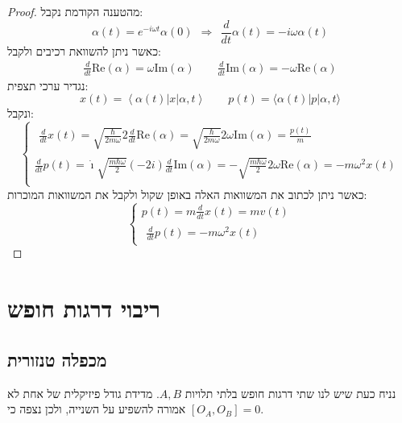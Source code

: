 \documentclass{tstextbook}
\begin{document}
\begin{proof}
מהטענה הקודמת נקבל:
$$\alpha(t)=e^{-i\omega t}\alpha(0)\ \ \Rightarrow\ \ \frac{d}{d t}\alpha(t)=-i\omega\alpha(t)$$
כאשר ניתן להשוואת רכיבים ולקבל:
$$\begin{array}{l}{{\frac{d}{d t}\mathrm{Re}\left( \alpha \right)=\omega\mathrm{Im}\left( \alpha \right)}}\qquad  {{\frac{d}{d t}\mathrm{Im}\left( \alpha \right)=-\omega \mathrm{Re}\left( \alpha \right)}}\end{array}$$
נגדיר ערכי תצפית:
$$x(t)=\left\langle \alpha(t)|x|\alpha,t \right\rangle \qquad p(t)=\langle\alpha(t)|p|\alpha,t\rangle$$
ונקבל:
$$\begin{cases}{\begin{array}{l}{{\frac{d}{d t}}x(t)={\sqrt{{\frac{\hbar}{2m\omega}}}}2{\frac{d}{d t}}\mathrm{Re}\left( \alpha \right)={\sqrt{\frac{\hbar}{2m\omega}}}2\omega \mathrm{Im}\left( \alpha \right)={\frac{p(t)}{m}}}\end{array}} \\\textstyle{\frac{d}{d t}}p(t)={\dot{\imath}}{\sqrt{\frac{m\hbar\omega}{2}}}(-2i){\frac{d}{d t}}\mathrm{Im}\left( \alpha \right)=-{\sqrt{\frac{m\hbar\omega}{2}}}2\omega \mathrm{Re}\left( \alpha \right)=-m\omega^{2}x(t) \\
\end{cases}$$
כאשר ניתן לכתוב את המשוואות האלה באופן שקול ולקבל את המשוואות המוכרות:
$$\begin{cases}p(t)=m{\frac{d}{d t}}x(t)=m v(t) \\{\begin{array}{l}{{\frac{d}{d t}}p(t)=-m\omega^{2}x(t)}\end{array}}
\end{cases}$$

\end{proof}
\chapter{ריבוי דרגות חופש}

\section{מכפלה טנזורית}

נניח כעת שיש לנו שתי דרגות חופש בלתי תלויות \(A,B\). מדידת גודל פיזיקלית של אחת לא אמורה להשפיע על השנייה, ולכן נצפה כי \([O_{A},O_{B}]=0\).
\end{document}
